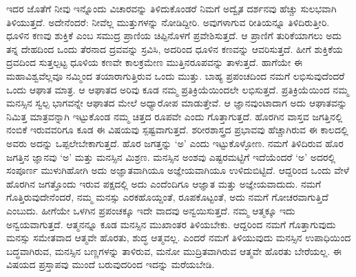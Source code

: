 ಇದರ ಜೊತೆಗೆ ನೀವು ಇನ್ನೊಂದು ವಿಚಾರವನ್ನು ತಿಳಿದುಕೊಂಡರೆ ನಿಮಗೆ ಅದ್ವೈತ ದರ್ಶನವು ಹೆಚ್ಚು ಸುಲಭವಾಗಿ ತಿಳಿಯುತ್ತದೆ. ಅದೇನೆಂದರೆ: ನೀವೆಲ್ಲ ಮುತ್ತುಗಳನ್ನು ನೋಡಿದ್ದೀರಿ. ಅವುಗಳಾಗುವ ರೀತಿಯನ್ನೂ ತಿಳಿದಿರುತ್ತೀರಿ. ಧೂಳಿನ ಕಣವು ಶುಕ್ತಿಕೆ ಎಂಬ ಸಮುದ್ರ ಪ್ರಾಣಿಯ ಚಿಪ್ಪಿನೊಳಗೆ ಪ್ರವೇಶಿಸುತ್ತದೆ. ಆ ಪ್ರಾಣಿಗೆ ತುರಿಕೆಯಾಗಲು ಅದು ತನ್ನ ದೇಹದಿಂದ ಒಂದು ತೆರನಾದ ದ್ರವವನ್ನು ಸ್ರವಿಸಿ, ಅದರಿಂದ ಧೂಳಿನ ಕಣವನ್ನು ಆವರಿಸುತ್ತದೆ. ಹೀಗೆ ಶುಕ್ತಿಕೆಯ ದ್ರವದಿಂದ ಸುತ್ತಲ್ಪಟ್ಟ ಧೂಳಿಯ ಕಣವೇ ಕಾಲಕ್ರಮೇಣ ಮುತ್ತಿನರೂಪವನ್ನು ತಾಳುತ್ತದೆ. ಹಾಗೆಯೇ ಈ ಮಹಾವಿಶ್ವವೆಲ್ಲವೂ ನಮ್ಮಿಂದ ತಯಾರಾಗುತ್ತಿರುವ ಒಂದು ಮುತ್ತು. ಬಾಹ್ಯ ಪ್ರಪಂಚದಿಂದ ನಮಗೆ ಲಭಿಸುವುದೆಂದರೆ ಒಂದು ಆಘಾತ ಮಾತ್ರ. ಆ ಆಘಾತದ ಅರಿವು ಕೂಡ ನಮ್ಮ ಪ್ರತಿಕ್ರಿಯೆಯಿಂದಲೇ ಲಭಿಸುತ್ತದೆ. ಪ್ರತಿಕ್ರಿಯೆಯಿಂದ ನಮ್ಮ ಮನಸ್ಸಿನ ಸ್ವಲ್ಪ ಭಾಗವನ್ನೇ ಆಘಾತದ ಮೇಲೆ ಅಧ್ಯಾರೋಪ ಮಾಡುತ್ತೇವೆ. ಆ ಜ್ಞಾನವುಂಟಾದಾಗ ಅದು ಆಘಾತವನ್ನು ನಿಮಿತ್ತ ಮಾತ್ರವನ್ನಾಗಿ ಇಟ್ಟುಕೊಂಡ ನಮ್ಮ ಚಿತ್ತದ ರೂಪವೇ ಎಂದು ಗೊತ್ತಾಗುತ್ತದೆ. ಹೊರಗಿನ ವಾಸ್ತವ ಜಗತ್ತಿನಲ್ಲಿ ನಂಬಿಕೆ ಇರುವವರಿಗೂ ಕೂಡ ಈ ವಿಷಯವು ಸ್ಪಷ್ಟವಾಗುತ್ತದೆ. ಶರೀರಶಾಸ್ತ್ರದ ಪ್ರಭಾವವು ಹೆಚ್ಚಾಗಿರುವ ಈ ಕಾಲದಲ್ಲಿ ಅವರು ಅದನ್ನು ಒಪ್ಪಲೇಬೇಕಾಗುತ್ತದೆ. ಹೊರ ಜಗತ್ತನ್ನು ‘ಅ’ ಎಂದು ಇಟ್ಟುಕೊಳ್ಳೋಣ. ನಮಗೆ ತಿಳಿದಿರುವ ಹೊರ ಜಗತ್ತಿನ ಜ್ಞಾನವು ‘ಅ’ ಮತ್ತು ಮನಸ್ಸಿನ ಮಿಶ್ರಣ. ಮನಸ್ಸಿನ ಅಂಶವು ಎಷ್ಟರಮಟ್ಟಿಗೆ ಇದೆಯೆಂದರೆ ‘ಅ’ ಅದರಲ್ಲಿ ಸಂಪೂರ್ಣ ಮುಳುಗಿಹೋಗಿ ಅದು ಅಜ್ಞಾತವಾಗಿಯೂ ಅಜ್ಞೇಯವಾಗಿಯೂ ಉಳಿದುಬಿಟ್ಟಿದೆ. ಆದ್ದರಿಂದ ಒಂದು ವೇಳೆ ಹೊರಗಿನ ಜಗತ್ತೊಂದು ಇರುವ ಪಕ್ಷದಲ್ಲಿ ಅದು ಎಂದೆಂದಿಗೂ ಆಜ್ಞಾತ ಮತ್ತು ಅಜ್ಞೇಯವಾದುದು. ನಮಗೆ ಗೊತ್ತಿರುವುದೇನೆಂದರೆ, ನಮ್ಮ ಮನಸ್ಸು ಎರಕಹೊಯ್ದಂತೆ, ರೂಪಕೊಟ್ಟಂತೆ, ಅದು ನಮಗೆ ಗೋಚರವಾಗುತ್ತಿದೆ ಎಂಬುದು. ಹೀಗೆಯೇ ಒಳಗಿನ ಪ್ರಪಂಚಕ್ಕೂ ಇದೇ ವಾದವು ಅನ್ವಯಿಸುತ್ತದೆ. ನಮ್ಮ ಆತ್ಮಕ್ಕೂ ಇದು ಅನ್ವಯವಾಗುತ್ತದೆ. ಆತ್ಮನನ್ನೂ ಕೂಡ ಮನಸ್ಸಿನ ಮುಖಾಂತರ ತಿಳಿಯಬೇಕು. ಆದ್ದರಿಂದ ನಮಗೆ ಗೊತ್ತಾಗುವುದು ಮನಸ್ಸು ಸಮೇತವಾದ ಆತ್ಮವೇ ಹೊರತು, ಶುದ್ಧ ಆತ್ಮವಲ್ಲ. ಎಂದರೆ ನಮಗೆ ತಿಳಿಯುವುದು ಮನಸ್ಸಿನ ಉಪಾಧಿಯಿಂದ ಬದ್ಧವಾಗಿರುವ, ಮನಸ್ಸಿನ ಬಣ್ಣಗಳನ್ನು ತಾಳಿರುವ, ಮನೋ ಮುದ್ರಿತವಾಗಿರುವ ಆತ್ಮವೇ ಹೊರತು ಬೇರೆಯಲ್ಲ. ಈ ವಿಷಯದ ಪ್ರಸ್ತಾಪವು ಮುಂದೆ ಬರುವುದರಿಂದ ಇದನ್ನು ಮರೆಯಬೇಡಿ.

